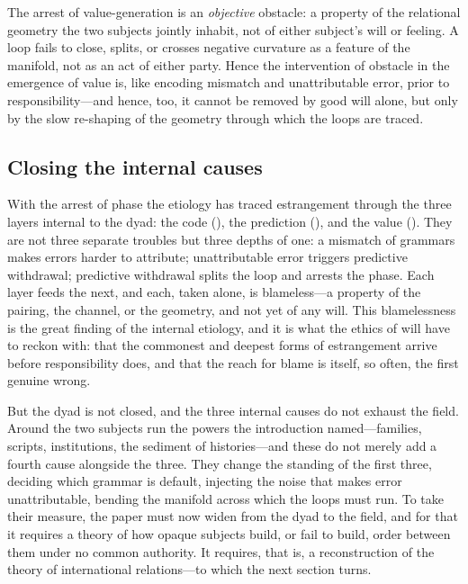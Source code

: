 \begin{claim}
The arrest of value-generation is an \emph{objective} obstacle: a property of the relational geometry the two subjects jointly inhabit, not of either subject's will or feeling. A loop fails to close, splits, or crosses negative curvature as a feature of the manifold, not as an act of either party. Hence the intervention of obstacle in the emergence of value is, like encoding mismatch and unattributable error, prior to responsibility---and hence, too, it cannot be removed by good will alone, but only by the slow re-shaping of the geometry through which the loops are traced.
\end{claim}

\subsection{Closing the internal causes}
\label{p17:sub:phase-close}

With the arrest of phase the etiology has traced estrangement through the three layers internal to the dyad: the code (), the prediction (), and the value (). They are not three separate troubles but three depths of one: a mismatch of grammars makes errors harder to attribute; unattributable error triggers predictive withdrawal; predictive withdrawal splits the loop and arrests the phase. Each layer feeds the next, and each, taken alone, is blameless---a property of the pairing, the channel, or the geometry, and not yet of any will. This blamelessness is the great finding of the internal etiology, and it is what the ethics of  will have to reckon with: that the commonest and deepest forms of estrangement arrive before responsibility does, and that the reach for blame is itself, so often, the first genuine wrong.

But the dyad is not closed, and the three internal causes do not exhaust the field. Around the two subjects run the powers the introduction named---families, scripts, institutions, the sediment of histories---and these do not merely add a fourth cause alongside the three. They change the standing of the first three, deciding which grammar is default, injecting the noise that makes error unattributable, bending the manifold across which the loops must run. To take their measure, the paper must now widen from the dyad to the field, and for that it requires a theory of how opaque subjects build, or fail to build, order between them under no common authority. It requires, that is, a reconstruction of the theory of international relations---to which the next section turns.
